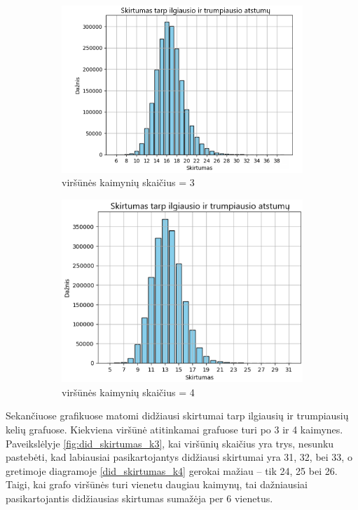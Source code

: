 \documentclass[bibliography=totoc]{article}
\begin{document}
\begin{figure}[h]
\centering
\begin{subfigure}{.5\textwidth}
    \centering
    \includegraphics[scale = .5]{skirtumas_k3.png}
    \caption{viršūnės kaimynių skaičius = 3}
    \label{fig:skirtumas_k3}
\end{subfigure}%
\begin{subfigure}{.5\textwidth}
    \centering
    \includegraphics[scale = .55]{skirtumas_k4.png}
    \caption{viršūnės kaimynių skaičius = 4}
    \label{fig:skirtumas_k4}
\end{subfigure}
\caption{}
\end{figure}

Sekančiuose grafikuose matomi didžiausi skirtumai tarp ilgiausių ir trumpiausių kelių grafuose. Kiekviena viršūnė atitinkamai grafuose turi po 3 ir 4 kaimynes. Paveikslėlyje \ref{fig:did_skirtumas_k3}, kai viršūnių skaičius yra trys, nesunku pastebėti, kad labiausiai pasikartojantys didžiausi skirtumai yra 31, 32, bei 33, o gretimoje diagramoje \ref{did_skirtumas_k4} gerokai mažiau – tik 24, 25 bei 26. Taigi, kai grafo viršūnės turi vienetu daugiau kaimynų, tai dažniausiai pasikartojantis didžiausias skirtumas sumažėja per 6 vienetus.
\end{document}
